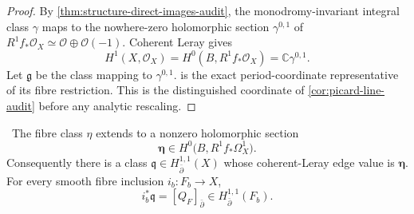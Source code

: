 \begin{proof}
By \cref{thm:structure-direct-images-audit}, the monodromy-invariant
integral class $\gamma$ maps to the nowhere-zero holomorphic section
$\gamma^{0,1}$ of
$R^1f_*\mathcal O_X\simeq\mathcal O\oplus\mathcal O(-1)$.  Coherent
Leray gives
\[
 H^1(X,\mathcal O_X)=H^0(B,R^1f_*\mathcal O_X)
 =\mathbb C\gamma^{0,1}.
\]
Let $\mathfrak g$ be the class mapping to $\gamma^{0,1}$.
 is the exact period-coordinate
representative of its fibre restriction.  This is the distinguished
coordinate of \cref{cor:picard-line-audit} before any analytic rescaling.
\end{proof}

\begin{lemma}
\label{lem:bcpr-eta-extension}
\Verified\ The fibre class $\eta$ extends to a nonzero holomorphic section
\begin{equation}
 \boldsymbol\eta\in
 H^0\bigl(B,R^1f_*\Omega_X^1\bigr).
\label{eq:bcpr-eta-global-section}
\end{equation}
Consequently there is a class
$\mathfrak q\in H^{1,1}_{\bar\partial}(X)$ whose coherent-Leray edge
value is $\boldsymbol\eta$.  For every smooth fibre inclusion
$i_b\colon F_b\to X$,
\begin{equation}
 i_b^*\mathfrak q=[Q_F]_{\bar\partial}
 \in H^{1,1}_{\bar\partial}(F_b).
\label{eq:bcpr-q-restriction}
\end{equation}
\end{lemma}

